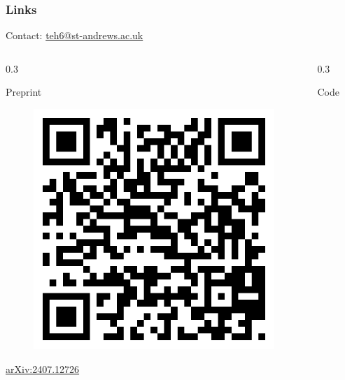 \documentclass[compress,handout]{beamer}
\begin{document}
\begin{frame}
  \frametitle{Links}


  \begin{center}
    Contact: {\href{mailto:teh6@st-andrews.ac.uk}{teh6@st-andrews.ac.uk}}
  \end{center}

  \begin{columns}
  \begin{column}{0.3\framewidth}
    \begin{center}
      Preprint
      \begin{figure}
        \includegraphics[width=\textwidth]{arxiv-qr.png}
      \end{figure}
      \href{https://doi.org/10.48550/arXiv.2407.12726}{arXiv:2407.12726}
    \end{center}
  \end{column}
  \begin{column}{0.3\framewidth}
    \begin{center}
      Code
      \begin{figure}

\end{figure}
\end{center}
\end{column}
\end{columns}
\end{frame}
\end{document}
